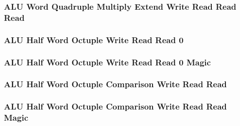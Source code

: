 

\subsubsection[{\small ALU Word Quadruple Multiply Extend Write Read Read Read}]{ALU Word Quadruple Multiply Extend Write Read Read Read} \label{sec:format-ALU-WQMXWRRR}



\subsubsection[{\small ALU Half Word Octuple Write Read Read 0}]{ALU Half Word Octuple Write Read Read 0} \label{sec:format-ALU-HOWRR0}



\subsubsection[{\small ALU Half Word Octuple Write Read Read 0 Magic}]{ALU Half Word Octuple Write Read Read 0 Magic} \label{sec:format-ALU-HOWRR0.M}



\subsubsection[{\small ALU Half Word Octuple Comparison Write Read Read}]{ALU Half Word Octuple Comparison Write Read Read} \label{sec:format-ALU-HOCWRR}



\subsubsection[{\small ALU Half Word Octuple Comparison Write Read Read Magic}]{ALU Half Word Octuple Comparison Write Read Read Magic} \label{sec:format-ALU-HOCWRR.M}

